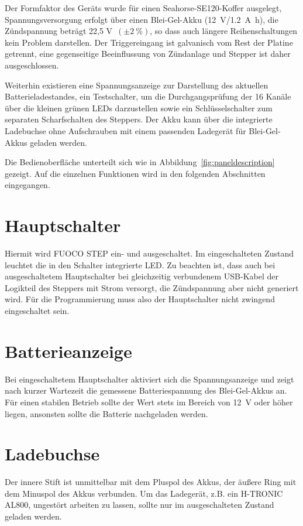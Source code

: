 \documentclass[paper=a4, open=any]{scrbook}
\begin{document}
		Der Formfaktor des Geräts wurde für einen Seahorse-SE120-Koffer ausgelegt, Spannungsversorgung erfolgt über einen Blei-Gel-Akku (\SI{12}{\volt}/\SI{1,2}{\ampere\hour}), die Zündspannung beträgt 22,5 V~$(\pm\SI{2}{\percent})$, so dass auch längere Reihenschaltungen kein Problem darstellen. Der Triggereingang ist galvanisch vom Rest der Platine getrennt, eine gegenseitige Beeinflussung von Zündanlage und Stepper ist daher ausgeschlossen.

		Weiterhin existieren eine Spannungsanzeige zur Darstellung des aktuellen Batterieladestandes, ein Testschalter, um die Durchgangsprüfung der 16 Kanäle über die kleinen grünen LEDs darzustellen sowie ein Schlüsselschalter zum separaten Scharfschalten des Steppers. Der Akku kann über die integrierte Ladebuchse ohne Aufschrauben mit einem passenden Ladegerät für Blei-Gel-Akkus geladen werden.

		Die Bedienoberfläche unterteilt sich wie in Abbildung~\ref{fig:paneldescription} gezeigt. Auf die einzelnen Funktionen wird in den folgenden Abschnitten eingegangen.

		\section{Hauptschalter}

			Hiermit wird FUOCO STEP ein- und ausgeschaltet. Im eingeschalteten Zustand leuchtet die in den Schalter integrierte LED. Zu beachten ist, dass auch bei ausgeschaltetem Hauptschalter bei gleichzeitig verbundenem USB-Kabel der Logikteil des Steppers mit Strom versorgt, die Zündspannung aber nicht generiert wird. Für die Programmierung muss also der Hauptschalter nicht zwingend eingeschaltet sein.

		\section{Batterieanzeige}

			Bei eingeschaltetem Hauptschalter aktiviert sich die Spannungsanzeige und zeigt nach kurzer Wartezeit die gemessene Batteriespannung des Blei-Gel-Akkus an. Für einen stabilen Betrieb sollte der Wert stets im Bereich von \SI{12}{\volt} oder höher liegen, ansonsten sollte die Batterie nachgeladen werden.

		\section{Ladebuchse}

			Der innere Stift ist unmittelbar mit dem Pluspol des Akkus, der äußere Ring mit dem Minuspol des Akkus verbunden. Um das Ladegerät, z.B. ein H-TRONIC AL800, ungestört arbeiten zu lassen, sollte nur im ausgeschalteten Zustand geladen werden.
\end{document}
